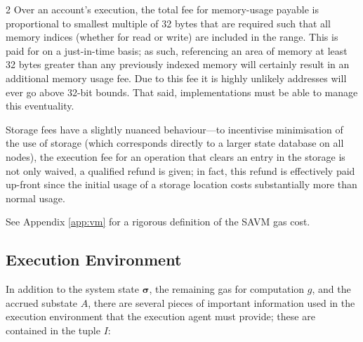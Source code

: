 \documentclass[9pt,oneside]{amsart}
\makeatletter
\newcommand{\linkdest}[1]{\Hy@raisedlink{\hypertarget{#1}{}}}
\makeatother
\begin{document}
\begin{multicols}{2}
Over an account's execution, the total fee for memory-usage payable is proportional to smallest multiple of 32 bytes that are required such that all memory indices (whether for read or write) are included in the range. This is paid for on a just-in-time basis; as such, referencing an area of memory at least 32 bytes greater than any previously indexed memory will certainly result in an additional memory usage fee. Due to this fee it is highly unlikely addresses will ever go above 32-bit bounds. That said, implementations must be able to manage this eventuality.

Storage fees have a slightly nuanced behaviour---to incentivise minimisation of the use of storage (which corresponds directly to a larger state database on all nodes), the execution fee for an operation that clears an entry in the storage is not only waived, a qualified refund is given; in fact, this refund is effectively paid up-front since the initial usage of a storage location costs substantially more than normal usage.

See Appendix \ref{app:vm} for a rigorous definition of the SAVM gas cost.

\subsection{Execution Environment}\linkdest{exec_env}

In addition to the system state $\boldsymbol{\sigma}$, the remaining gas for computation $g$, and the accrued substate $A$,
there are several pieces of important information used in the execution environment that the execution agent must provide; these are contained in the tuple $I$:


\end{multicols}
\end{document}
